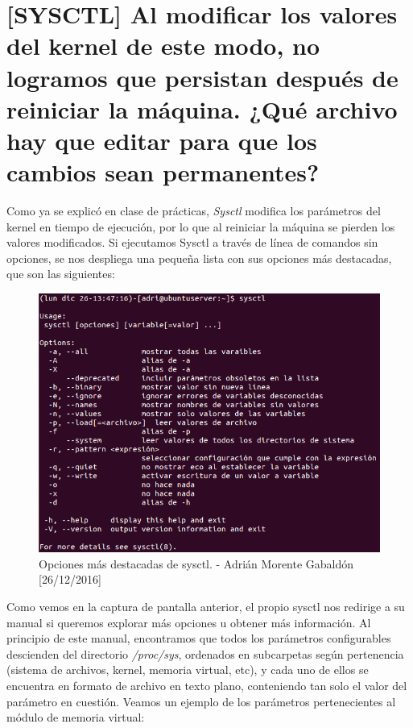 \section{[SYSCTL] Al modificar los valores del kernel de este modo, no logramos que persistan después de reiniciar la máquina. ¿Qué archivo hay que editar para que los cambios sean permanentes?}
Como ya se explicó en clase de prácticas, \emph{Sysctl} modifica los parámetros del kernel en tiempo de ejecución, por lo que al reiniciar la máquina se pierden los valores modificados. Si ejecutamos Sysctl a través de línea de comandos sin opciones, se nos despliega una pequeña lista con sus opciones más destacadas, que son las siguientes:
\begin{figure}[H]
	\centering
	\includegraphics[scale=0.6]{sysctl-h}
	\caption{Opciones más destacadas de sysctl. - Adrián Morente Gabaldón [26/12/2016]}
	\label{figura1}
\end{figure}
Como vemos en la captura de pantalla anterior, el propio sysctl nos redirige a su manual si queremos explorar más opciones u obtener más información. Al principio de este manual, encontramos que todos los parámetros configurables descienden del directorio \emph{/proc/sys}, ordenados en subcarpetas según pertenencia (sistema de archivos, kernel, memoria virtual, etc), y cada uno de ellos se encuentra en formato de archivo en texto plano, conteniendo tan solo el valor del parámetro en cuestión. Veamos un ejemplo de los parámetros pertenecientes al módulo de memoria virtual:
